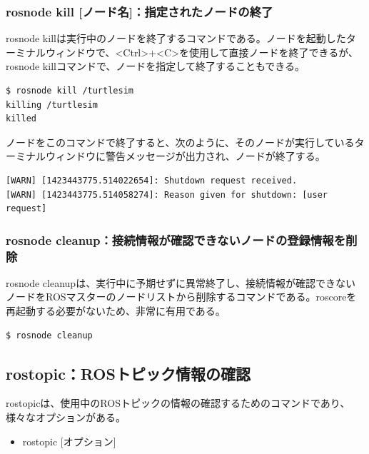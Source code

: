 \subsubsection{rosnode kill [ノード名]：指定されたノードの終了}

rosnode killは実行中のノードを終了するコマンドである。ノードを起動したターミナルウィンドウで、<Ctrl>+<C>を使用して直接ノードを終了できるが、rosnode killコマンドで、ノードを指定して終了することもできる。

\begin{lstlisting}[language=ROS]
$ rosnode kill /turtlesim
killing /turtlesim
killed
\end{lstlisting}

ノードをこのコマンドで終了すると、次のように、そのノードが実行しているターミナルウィンドウに警告メッセージが出力され、ノードが終了する。

\begin{lstlisting}[language=ROS]
[WARN] [1423443775.514022654]: Shutdown request received.
[WARN] [1423443775.514058274]: Reason given for shutdown: [user request]
\end{lstlisting}

\subsubsection{rosnode cleanup：接続情報が確認できないノードの登録情報を削除}

rosnode cleanupは、実行中に予期せずに異常終了し、接続情報が確認できないノードをROSマスターのノードリストから削除するコマンドである。roscoreを再起動する必要がないため、非常に有用である。

\begin{lstlisting}[language=ROS]
$ rosnode cleanup
\end{lstlisting}

\subsection{rostopic：ROSトピック情報の確認}

rostopicは、使用中のROSトピックの情報の確認するためのコマンドであり、様々なオプションがある。

\begin{itemize}
\item  rostopic [オプション]
\end{itemize}

